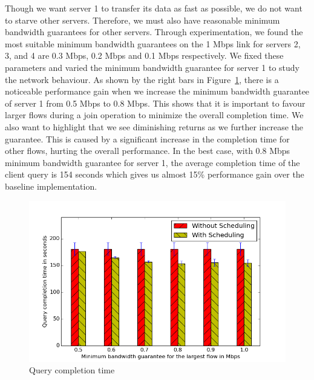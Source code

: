 \documentclass{acm_proc_article-sp}
\begin{document}
Though we want server 1 to transfer its data as fast as possible, we do not want to starve other servers.
Therefore, we must also have reasonable minimum bandwidth guarantees for other servers.
Through experimentation, we found the most suitable minimum bandwidth guarantees on the 1 Mbps link for servers 2, 3, and 4 are 0.3 Mbps, 0.2 Mbps and 0.1 Mbps respectively.
We fixed these parameters and varied the minimum bandwidth guarantee for server 1 to study the network behaviour.
As shown by the right bars in Figure~\ref{fig:micro_benchmark_total_time}, there is a noticeable performance gain when we increase the minimum bandwidth guarantee of server 1 from 0.5 Mbps to 0.8 Mbps.
This shows that it is important to favour larger flows during a join operation to minimize the overall completion time.
We also want to highlight that we see diminishing returns as we further increase the guarantee.
This is caused by a significant increase in the completion time for other flows, hurting the overall performance.
In the best case, with 0.8 Mbps minimum bandwidth guarantee for server 1, the average completion time of the client query is 154 seconds which gives us almost 15\% performance gain over the baseline implementation.

\begin{figure}
    \centering
    \includegraphics[scale=0.47]{figures/simple_topo_overall.png}
    \caption{Query completion time}\label{fig:micro_benchmark_total_time}
\end{figure}
\end{document}
